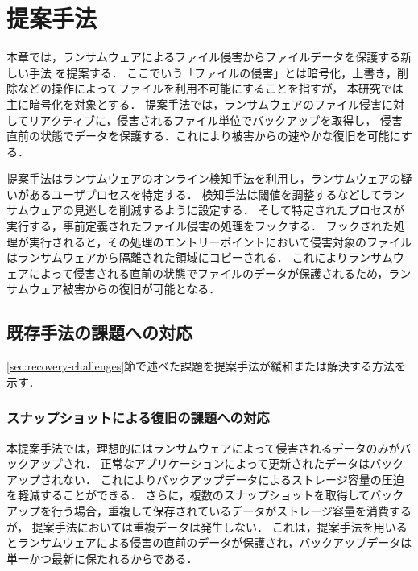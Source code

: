 \chapter{提案手法}
\label{chap:approach}
本章では，ランサムウェアによるファイル侵害からファイルデータを保護する新しい手法
を提案する．
ここでいう「ファイルの侵害」とは暗号化，上書き，削除などの操作によってファイルを利用不可能にすることを指すが，
本研究では主に暗号化を対象とする．
提案手法では，ランサムウェアのファイル侵害に対してリアクティブに，侵害されるファイル単位でバックアップを取得し，
侵害直前の状態でデータを保護する．これにより被害からの速やかな復旧を可能にする．

提案手法はランサムウェアのオンライン検知手法を利用し，ランサムウェアの疑いがあるユーザプロセスを特定する．
検知手法は閾値を調整するなどしてランサムウェアの見逃しを削減するように設定する．
そして特定されたプロセスが実行する，事前定義されたファイル侵害の処理をフックする．
フックされた処理が実行されると，その処理のエントリーポイントにおいて侵害対象のファイルはランサムウェアから隔離された領域にコピーされる．
これによりランサムウェアによって侵害される直前の状態でファイルのデータが保護されるため，ランサムウェア被害からの復旧が可能となる．

\section{既存手法の課題への対応}
\ref{sec:recovery-challenges}節で述べた課題を提案手法が緩和または解決する方法を示す．
\subsection{スナップショットによる復旧の課題への対応}
本提案手法では，理想的にはランサムウェアによって侵害されるデータのみがバックアップされ．
正常なアプリケーションによって更新されたデータはバックアップされない．
これによりバックアップデータによるストレージ容量の圧迫を軽減することができる．
さらに，複数のスナップショットを取得してバックアップを行う場合，重複して保存されているデータがストレージ容量を消費するが，
提案手法においては重複データは発生しない．
これは，提案手法を用いるとランサムウェアによる侵害の直前のデータが保護され，バックアップデータは単一かつ最新に保たれるからである．

